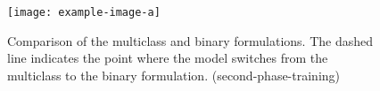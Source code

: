 \begin{figure}[htb]
    \centering
    \texttt{[image: example-image-a]}
    \caption{Comparison of the multiclass and binary formulations. The dashed line indicates the point where the model
        switches from the multiclass to the binary formulation. (second-phase-training)}
    \label{fig:two-phase-training}
\end{figure}